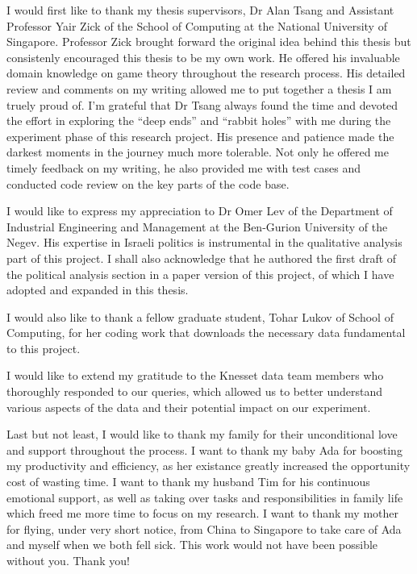 \begin{acknowledgments}
  I would first like to thank my thesis supervisors, Dr Alan Tsang and
  Assistant Professor Yair Zick of the School of Computing at the National
  University of Singapore.
  Professor Zick brought forward the original idea behind this thesis but
  consistenly encouraged this thesis to be my own work.
  He offered his invaluable domain knowledge on game theory throughout the
  research process.
  His detailed review and comments on my writing allowed me to put together
  a thesis I am truely proud of.
  I'm grateful that Dr Tsang always found the time and devoted the effort in
  exploring the ``deep ends'' and ``rabbit holes'' with me during the
  experiment phase of this research project.
  His presence and patience made the darkest moments in the journey much more
  tolerable.
  Not only he offered me timely feedback on my writing, he also provided me
  with test cases and conducted code review on the key parts of the code base.

  I would like to express my appreciation to Dr Omer Lev of the Department of
  Industrial Engineering and Management at the Ben-Gurion University of the
  Negev.
  His expertise in Israeli politics is instrumental in the qualitative analysis
  part of this project.
  I shall also acknowledge that he authored the first draft of the political
  analysis section in a paper version of this project, of which I have adopted
  and expanded in this thesis.

  I would also like to thank a fellow graduate student, Tohar Lukov of School
  of Computing, for her coding work that downloads the necessary data
  fundamental to this project.

  I would like to extend my gratitude to the Knesset data team members who
  thoroughly responded to our queries, which allowed us to better understand
  various aspects of the data and their potential impact on our experiment.

  Last but not least, I would like to thank my family for their unconditional
  love and support throughout the process.
  I want to thank my baby Ada for boosting my productivity and efficiency, as
  her existance greatly increased the opportunity cost of wasting time.
  I want to thank my husband Tim for his continuous emotional support, as well
  as taking over tasks and responsibilities in family life which freed me more
  time to focus on my research.
  I want to thank my mother for flying, under very short notice, from China to
  Singapore to take care of Ada and myself when we both fell sick.
  This work would not have been possible without you. Thank you!

\end{acknowledgments}
